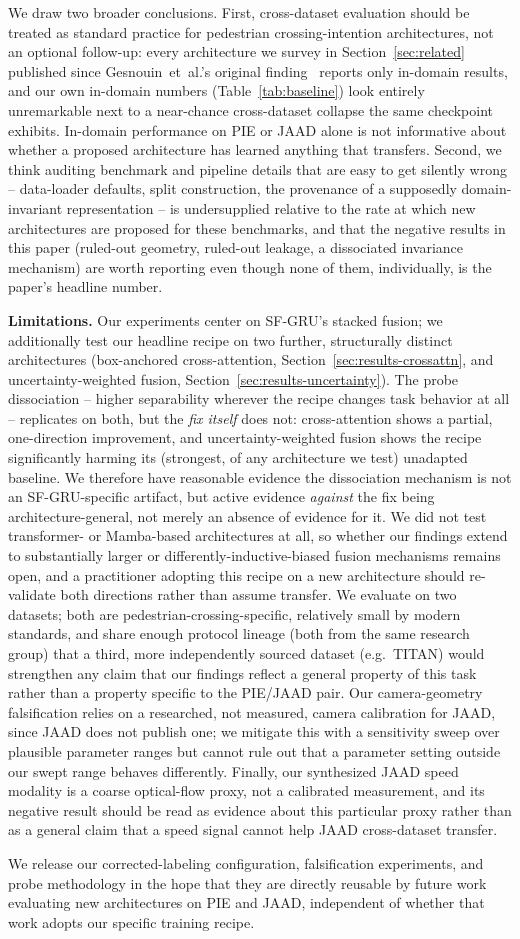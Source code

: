 We draw two broader conclusions. First, cross-dataset evaluation should
be treated as standard practice for pedestrian crossing-intention
architectures, not an optional follow-up: every architecture we survey
in Section~\ref{sec:related} published since Gesnouin~et~al.'s original
finding~\cite{gesnouin2022} reports only in-domain results, and our own
in-domain numbers (Table~\ref{tab:baseline}) look entirely unremarkable
next to a near-chance cross-dataset collapse the same checkpoint
exhibits. In-domain performance on PIE or JAAD alone is not informative
about whether a proposed architecture has learned anything that
transfers. Second, we think auditing benchmark and pipeline details
that are easy to get silently wrong -- data-loader defaults, split
construction, the provenance of a supposedly domain-invariant
representation -- is undersupplied relative to the rate at which new
architectures are proposed for these benchmarks, and that the negative
results in this paper (ruled-out geometry, ruled-out leakage, a
dissociated invariance mechanism) are worth reporting even though none
of them, individually, is the paper's headline number.

\textbf{Limitations.} Our experiments center on SF-GRU's stacked fusion;
we additionally test our headline recipe on two further, structurally
distinct architectures (box-anchored cross-attention,
Section~\ref{sec:results-crossattn}, and uncertainty-weighted fusion,
Section~\ref{sec:results-uncertainty}). The probe dissociation --
higher separability wherever the recipe changes task behavior at all --
replicates on both, but the \emph{fix itself} does not: cross-attention
shows a partial, one-direction improvement, and uncertainty-weighted
fusion shows the recipe significantly harming its (strongest, of any
architecture we test) unadapted baseline. We therefore have reasonable
evidence the dissociation mechanism is not an SF-GRU-specific artifact,
but active evidence \emph{against} the fix being architecture-general,
not merely an absence of evidence for it. We did not test transformer-
or Mamba-based architectures at all, so whether our findings extend to
substantially larger or differently-inductive-biased fusion mechanisms
remains open, and a practitioner adopting this recipe on a new
architecture should re-validate both directions rather than assume
transfer. We evaluate on two datasets; both are
pedestrian-crossing-specific,
relatively small by modern standards, and share enough protocol
lineage (both from the same research group) that a third, more
independently sourced dataset (e.g.\ TITAN) would strengthen any claim
that our findings reflect a general property of this task rather than
a property specific to the PIE/JAAD pair. Our camera-geometry
falsification relies on a researched, not measured, camera calibration
for JAAD, since JAAD does not publish one; we mitigate this with a
sensitivity sweep over plausible parameter ranges but cannot rule out
that a parameter setting outside our swept range behaves differently.
Finally, our synthesized JAAD speed modality is a coarse optical-flow
proxy, not a calibrated measurement, and its negative result should be
read as evidence about this particular proxy rather than as a general
claim that a speed signal cannot help JAAD cross-dataset transfer.

We release our corrected-labeling configuration, falsification
experiments, and probe methodology in the hope that they are directly
reusable by future work evaluating new architectures on PIE and JAAD,
independent of whether that work adopts our specific training recipe.
